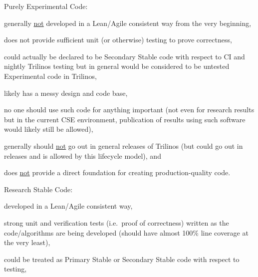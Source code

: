 \documentclass[11pt]{SANDreport}
\begin{document}
\begin{compactenum}

{}\item Purely Experimental Code:

\begin{compactitem}

{}\item generally {}\underline{not} developed in a Lean/Agile
consistent way from the very beginning,

{}\item does not provide sufficient unit (or otherwise) testing to
prove correctness,

{}\item could actually be declared to be Secondary Stable code with
respect to CI and nightly Trilinos testing but in general would be
considered to be untested Experimental code in Trilinos,

{}\item likely has a messy design and code base,

{}\item no one should use such code for anything important (not even
for research results but in the current CSE environment, publication
of results using such software would likely still be allowed),

{}\item generally should {}\underline{not} go out in general releases
of Trilinos (but could go out in releases and is allowed by this
lifecycle model), and

{}\item does {}\underline{not} provide a direct foundation for
creating production-quality code.

\end{compactitem}

{}\item Research Stable Code:

\begin{compactitem}

{}\item developed in a Lean/Agile consistent way,

{}\item strong unit and verification tests (i.e.\ proof of
correctness) written as the code/algorithms are being developed
(should have almost 100\% line coverage at the very least),

{}\item could be treated as Primary Stable or Secondary Stable code
with respect to testing,


\end{compactitem}
\end{compactenum}
\end{document}
